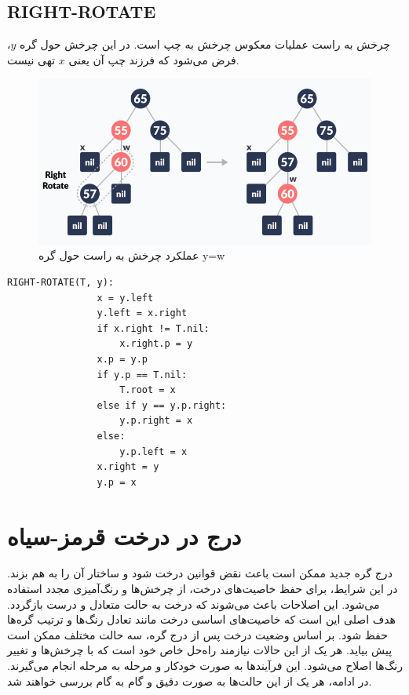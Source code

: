 \documentclass[a4paper,12pt]{article}
\begin{document}
	\subsection{RIGHT-ROTATE}
	چرخش به راست عملیات معکوس چرخش به چپ است. در این چرخش حول گره \( y\)، فرض می‌شود که فرزند چپ آن یعنی \(x\) تهی نیست.
	
	\begin{figure}[H]
		\centering
		 \includegraphics[width=1.1\textwidth]{img/right-rotation.png} %
		\caption{عملکرد چرخش به راست حول گره y=w}
	\end{figure}
	
	\begin{LTR}
		\begin{lstlisting}[caption={Right Rotation Pseudocode}, label={lst:right-rotate}]
			RIGHT-ROTATE(T, y):
				x = y.left
				y.left = x.right
				if x.right != T.nil:
					x.right.p = y
				x.p = y.p
				if y.p == T.nil:
					T.root = x
				else if y == y.p.right:
					y.p.right = x
				else:
					y.p.left = x
				x.right = y
				y.p = x
		\end{lstlisting}
	\end{LTR}
	
	
	\section{درج در درخت قرمز-سیاه}
	درج گره جدید ممکن است باعث نقض قوانین درخت شود و ساختار آن را به هم بزند. در این شرایط، برای حفظ خاصیت‌های درخت، از چرخش‌ها و رنگ‌آمیزی مجدد استفاده می‌شود. این اصلاحات باعث می‌شوند که درخت به حالت متعادل و درست بازگردد. هدف اصلی این است که خاصیت‌های اساسی درخت مانند تعادل رنگ‌ها و ترتیب گره‌ها حفظ شود. بر اساس وضعیت درخت پس از درج گره، سه حالت مختلف ممکن است پیش بیاید. هر یک از این حالات نیازمند راه‌حل خاص خود است که با چرخش‌ها و تغییر رنگ‌ها اصلاح می‌شود. این فرآیندها به صورت خودکار و مرحله به مرحله انجام می‌گیرند.
	در ادامه، هر یک از این حالت‌ها به صورت دقیق و گام به گام بررسی خواهند شد.
	
\end{document}
